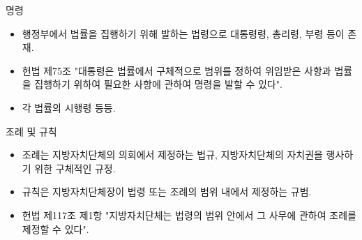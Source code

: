 \documentclass[aspectratio=169,xcolor=dvipsnames,handout]{beamer}
\begin{document}
\begin{frame}{명령}
    \begin{itemize}
        \item 행정부에서 법률을 집행하기 위해 발하는 법령으로 대통령령, 총리령, 부령 등이 존재.
        \item 헌법 제75조 "대통령은 법률에서 구체적으로 범위를 정하여 위임받은 사항과 법률을 집행하기 위하여 필요한 사항에 관하여 명령을 발할 수 있다".
        \item 각 법률의 시행령 등등.
    \end{itemize}
\end{frame}

\begin{frame}{조례 및 규칙}
    \begin{itemize}
        \item 조례는 지방자치단체의 의회에서 제정하는 법규, 지방자치단체의 자치권을 행사하기 위한 구체적인 규정. 
        \item 규칙은 지방자치단체장이 법령 또는 조례의 범위 내에서 제정하는 규범.
        \item 헌법 제117조 제1항 "지방자치단체는 법령의 범위 안에서 그 사무에 관하여 조례를 제정할 수 있다".
    \end{itemize}
\end{frame}

\end{document}
